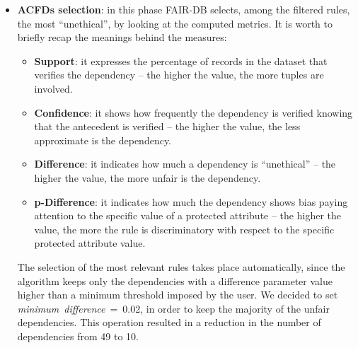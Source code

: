 \begin{itemize}
\item \textbf{ACFDs selection}: in this phase FAIR-DB selects, among the filtered rules, the most ``unethical'', by looking at the computed metrics. It is worth to briefly recap the meanings behind the measures:
\begin{itemize}
\item \textbf{Support}: it expresses the percentage of records in the dataset that verifies the dependency -- the higher the value, the more tuples are involved.
\item \textbf{Confidence}: it shows how frequently the dependency is verified knowing that the antecedent is verified -- the higher the value, the less approximate is the dependency.
\item \textbf{Difference}: it indicates how much a dependency is ``unethical'' -- the higher the value, the more unfair is the dependency.
\item \textbf{p-Difference}: it indicates how much the dependency shows bias paying attention to the specific value of a protected attribute -- the higher the value, the more the rule is discriminatory with respect to the specific protected attribute value.
\end{itemize}

The selection of the most relevant rules takes place automatically, since the algorithm keeps only the dependencies with a difference parameter value higher than a minimum threshold imposed by the user. We decided to set \textit{minimum~difference}~=~0.02, in order to keep the majority of the unfair dependencies. This operation resulted in a reduction in the number of dependencies from 49 to 10.


\end{itemize}
